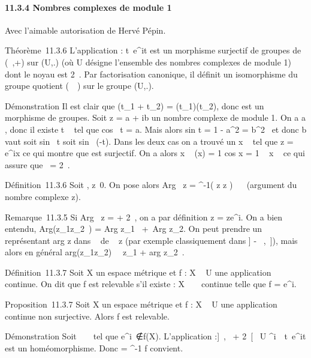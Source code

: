 \documentclass[]{article}
\begin{document}
\paragraph{11.3.4 Nombres complexes de module 1}

Avec l'aimable autorisation de Hervé Pépin.

Théorème~11.3.6 L'application \phi :
t\mapsto~e^it est un morphisme surjectif
de groupes de (~,+) sur (U,.) (où U désigne l'ensemble des nombres
complexes de module 1) dont le noyau est 2\pi~. Par factorisation
canonique, il définit un isomorphisme \overline\phi du
groupe quotient (~\pi~) sur le groupe (U,.).

Démonstration Il est clair que \phi(t_1 + t_2) =
\phi(t_1)\phi(t_2), donc \phi est un morphisme de groupes. Soit
z = a + ib un nombre complexe de module 1. On a a \in [-1,1], donc il
existe t \in {}~ tel que cos~ t = a. Mais alors
sin t = 1 - a^2 = b^2~ et
donc b vaut soit sin~ t soit
sin~ (-t). Dans les deux cas on a trouvé un x \in
{}~ tel que z = e^ix ce qui montre que \phi est surjectif. On a
alors x \in\mathrmKer~\phi
\Leftrightarrow \phi(x) = 1 \mathrel\Leftrightarrow
cos x = 1 \mathrel\Leftrightarrow~ x \pi~
ce qui assure que
\mathrmKer~\phi = 2\pi~.

Définition~11.3.6 Soit \zeta \in {}, z\neq~0. On pose
alors Arg~ z =
\overline\phi^-1( z \over
z ) \in {}~\pi~ (argument du nombre complexe z).

Remarque~11.3.5 Si Arg~ z = \theta + 2\pi~, on a par
définition z = ze^i\theta. On a bien entendu,
Arg(z_1z_2~)
= Arg z_1~ + z_2. On peut prendre un représentant
arg z dans ~ de \Arg~
z (par exemple classiquement dans ] - \pi~,\pi~]), mais alors en général
arg(z_1z_2)\neq~\arg~
z_1 + arg z_2~.

Définition~11.3.7 Soit X un espace métrique et f : X \rightarrow~ U une application
continue. On dit que f est relevable s'il existe \phi : X \rightarrow~ \mathbb{R}~ continue
telle que f = e^i\phi.

Proposition~11.3.7 Soit X un espace métrique et f : X \rightarrow~ U une
application continue non surjective. Alors f est relevable.

Démonstration Soit \alpha~ \in {}~ tel que
e^i\alpha~∉f(X). L'application \omega :]\alpha~,\alpha~
+ 2\pi~[\rightarrow~ U \diagdown\e^i\alpha~\,
t\mapsto~e^it est un homéomorphisme. Donc
\phi = \omega^-1 \cdot f convient.
\end{document}
